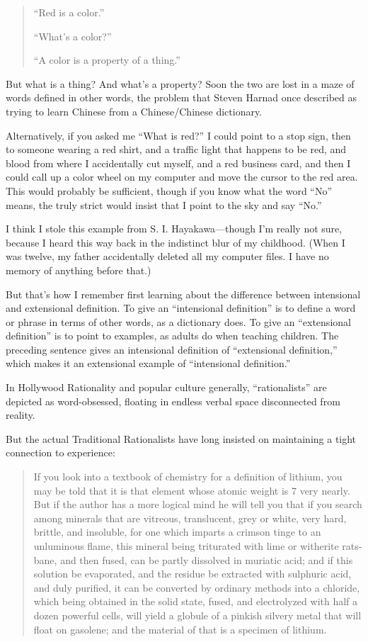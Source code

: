 {\begin{quote}
 ``Red is a color.''


 ``What's a
color?''

{
 ``A color is a property of a
  thing.''}
\end{quote}


 But what is a thing? And what's a property? Soon
the two are lost in a maze of words defined in other words, the problem
that Steven Harnad once described as trying to learn Chinese from a
Chinese/Chinese dictionary.


 Alternatively, if you asked me ``What is
red?'' I could point to a stop sign, then to someone
wearing a red shirt, and a traffic light that happens to be red, and
blood from where I accidentally cut myself, and a red business card,
and then I could call up a color wheel on my computer and move the
cursor to the red area. This would probably be sufficient, though if
you know what the word ``No'' means,
the truly strict would insist that I point to the sky and say
``No.''


 I think I stole this example from S. I. Hayakawa---though
I'm really not sure, because I heard this way back in
the indistinct blur of my childhood. (When I was twelve, my father
accidentally deleted all my computer files. I have no memory of
anything before that.)


 But that's how I remember first learning about the
difference between intensional and extensional definition. To give an
``intensional definition'' is to
define a word or phrase in terms of other words, as a dictionary does.
To give an ``extensional
definition'' is to point to examples, as adults do
when teaching children. The preceding sentence gives an intensional
definition of ``extensional
definition,'' which makes it an extensional example
of ``intensional definition.''


 In Hollywood Rationality and popular culture generally,
``rationalists'' are depicted as
word-obsessed, floating in endless verbal space disconnected from
reality.


 But the actual Traditional Rationalists have long insisted on
maintaining a tight connection to experience:

\begin{quote}

 If you look into a textbook of chemistry for a definition of
lithium, you may be told that it is that element whose atomic weight is
7 very nearly. But if the author has a more logical mind he will tell
you that if you search among minerals that are vitreous, translucent,
grey or white, very hard, brittle, and insoluble, for one which imparts
a crimson tinge to an unluminous flame, this mineral being triturated
with lime or witherite rats-bane, and then fused, can be partly
dissolved in muriatic acid; and if this solution be evaporated, and the
residue be extracted with sulphuric acid, and duly purified, it can be
converted by ordinary methods into a chloride, which being obtained in
the solid state, fused, and electrolyzed with half a dozen powerful
cells, will yield a globule of a pinkish silvery metal that will float
on gasolene; and the material of that is a specimen of lithium.


\end{quote}}
